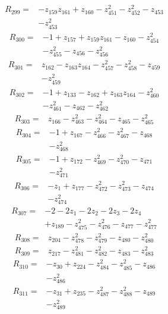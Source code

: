 \begin{align*}
R_{299}={}&-z_{159}z_{161}+z_{160}-z_{451}^{2}-z_{452}^{2}-z_{453}\\
&-z_{453}^{2}
\end{align*}
\begin{align*}
R_{300}={}&-1+z_{157}+z_{159}z_{161}-z_{160}-z_{454}^{2}\\
&-z_{455}^{2}-z_{456}-z_{456}^{2}
\end{align*}
\begin{align*}
R_{301}={}&z_{162}-z_{163}z_{164}-z_{457}^{2}-z_{458}^{2}-z_{459}\\
&-z_{459}^{2}
\end{align*}
\begin{align*}
R_{302}={}&-1+z_{133}-z_{162}+z_{163}z_{164}-z_{460}^{2}\\
&-z_{461}^{2}-z_{462}-z_{462}^{2}
\end{align*}
\begin{align*}
R_{303}={}&z_{166}-z_{463}^{2}-z_{464}^{2}-z_{465}-z_{465}^{2}
\end{align*}
\begin{align*}
R_{304}={}&-1+z_{167}-z_{466}^{2}-z_{467}^{2}-z_{468}\\
&-z_{468}^{2}
\end{align*}
\begin{align*}
R_{305}={}&-1+z_{172}-z_{469}^{2}-z_{470}^{2}-z_{471}\\
&-z_{471}^{2}
\end{align*}
\begin{align*}
R_{306}={}&-z_{1}+z_{177}-z_{472}^{2}-z_{473}^{2}-z_{474}\\
&-z_{474}^{2}
\end{align*}
\begin{align*}
R_{307}={}&-2-2z_{1}-2z_{2}-2z_{3}-2z_{4}\\
&+z_{189}-z_{475}^{2}-z_{476}^{2}-z_{477}-z_{477}^{2}
\end{align*}
\begin{align*}
R_{308}={}&z_{204}-z_{478}^{2}-z_{479}^{2}-z_{480}-z_{480}^{2}
\end{align*}
\begin{align*}
R_{309}={}&z_{217}-z_{481}^{2}-z_{482}^{2}-z_{483}-z_{483}^{2}
\end{align*}
\begin{align*}
R_{310}={}&-z_{30}+z_{224}-z_{484}^{2}-z_{485}^{2}-z_{486}\\
&-z_{486}^{2}
\end{align*}
\begin{align*}
R_{311}={}&-z_{31}+z_{235}-z_{487}^{2}-z_{488}^{2}-z_{489}\\
&-z_{489}^{2}
\end{align*}
